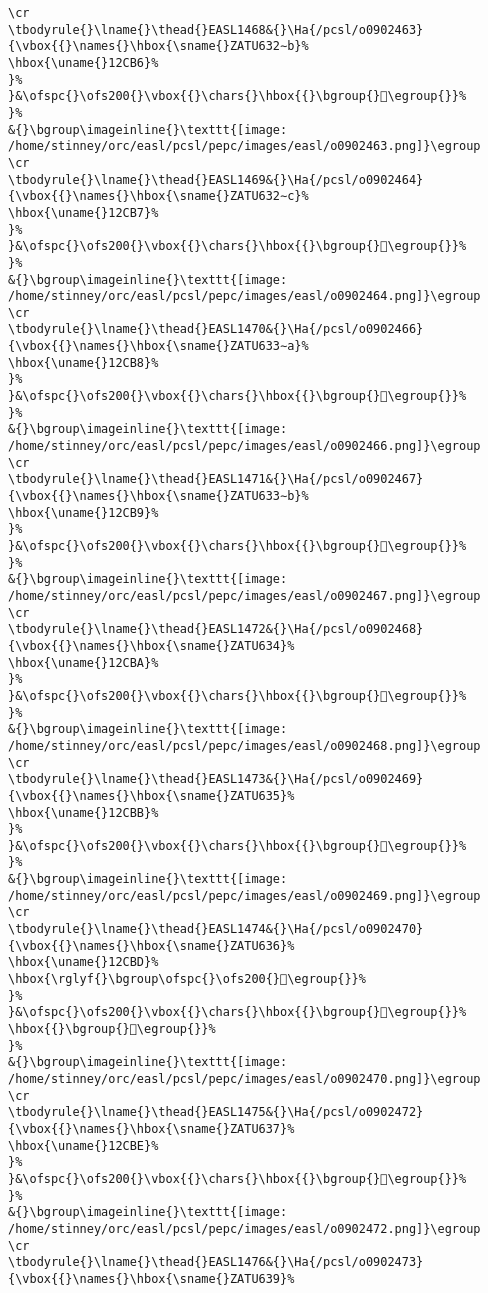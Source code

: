 \begin{verbatim}
\cr
\tbodyrule{}\lname{}\thead{}EASL1468&{}\Ha{/pcsl/o0902463}{\vbox{{}\names{}\hbox{\sname{}ZATU632∼b}%
\hbox{\uname{}12CB6}%
}%
}&\ofspc{}\ofs200{}\vbox{{}\chars{}\hbox{{}\bgroup{}𒲶\egroup{}}%
}%
&{}\bgroup\imageinline{}\texttt{[image: /home/stinney/orc/easl/pcsl/pepc/images/easl/o0902463.png]}\egroup
\cr
\tbodyrule{}\lname{}\thead{}EASL1469&{}\Ha{/pcsl/o0902464}{\vbox{{}\names{}\hbox{\sname{}ZATU632∼c}%
\hbox{\uname{}12CB7}%
}%
}&\ofspc{}\ofs200{}\vbox{{}\chars{}\hbox{{}\bgroup{}𒲷\egroup{}}%
}%
&{}\bgroup\imageinline{}\texttt{[image: /home/stinney/orc/easl/pcsl/pepc/images/easl/o0902464.png]}\egroup
\cr
\tbodyrule{}\lname{}\thead{}EASL1470&{}\Ha{/pcsl/o0902466}{\vbox{{}\names{}\hbox{\sname{}ZATU633∼a}%
\hbox{\uname{}12CB8}%
}%
}&\ofspc{}\ofs200{}\vbox{{}\chars{}\hbox{{}\bgroup{}𒲸\egroup{}}%
}%
&{}\bgroup\imageinline{}\texttt{[image: /home/stinney/orc/easl/pcsl/pepc/images/easl/o0902466.png]}\egroup
\cr
\tbodyrule{}\lname{}\thead{}EASL1471&{}\Ha{/pcsl/o0902467}{\vbox{{}\names{}\hbox{\sname{}ZATU633∼b}%
\hbox{\uname{}12CB9}%
}%
}&\ofspc{}\ofs200{}\vbox{{}\chars{}\hbox{{}\bgroup{}𒲹\egroup{}}%
}%
&{}\bgroup\imageinline{}\texttt{[image: /home/stinney/orc/easl/pcsl/pepc/images/easl/o0902467.png]}\egroup
\cr
\tbodyrule{}\lname{}\thead{}EASL1472&{}\Ha{/pcsl/o0902468}{\vbox{{}\names{}\hbox{\sname{}ZATU634}%
\hbox{\uname{}12CBA}%
}%
}&\ofspc{}\ofs200{}\vbox{{}\chars{}\hbox{{}\bgroup{}𒲺\egroup{}}%
}%
&{}\bgroup\imageinline{}\texttt{[image: /home/stinney/orc/easl/pcsl/pepc/images/easl/o0902468.png]}\egroup
\cr
\tbodyrule{}\lname{}\thead{}EASL1473&{}\Ha{/pcsl/o0902469}{\vbox{{}\names{}\hbox{\sname{}ZATU635}%
\hbox{\uname{}12CBB}%
}%
}&\ofspc{}\ofs200{}\vbox{{}\chars{}\hbox{{}\bgroup{}𒲻\egroup{}}%
}%
&{}\bgroup\imageinline{}\texttt{[image: /home/stinney/orc/easl/pcsl/pepc/images/easl/o0902469.png]}\egroup
\cr
\tbodyrule{}\lname{}\thead{}EASL1474&{}\Ha{/pcsl/o0902470}{\vbox{{}\names{}\hbox{\sname{}ZATU636}%
\hbox{\uname{}12CBD}%
\hbox{\rglyf{}\bgroup\ofspc{}\ofs200{}𒲽\egroup{}}%
}%
}&\ofspc{}\ofs200{}\vbox{{}\chars{}\hbox{{}\bgroup{}𒲼\egroup{}}%
\hbox{{}\bgroup{}𒲽\egroup{}}%
}%
&{}\bgroup\imageinline{}\texttt{[image: /home/stinney/orc/easl/pcsl/pepc/images/easl/o0902470.png]}\egroup
\cr
\tbodyrule{}\lname{}\thead{}EASL1475&{}\Ha{/pcsl/o0902472}{\vbox{{}\names{}\hbox{\sname{}ZATU637}%
\hbox{\uname{}12CBE}%
}%
}&\ofspc{}\ofs200{}\vbox{{}\chars{}\hbox{{}\bgroup{}𒲾\egroup{}}%
}%
&{}\bgroup\imageinline{}\texttt{[image: /home/stinney/orc/easl/pcsl/pepc/images/easl/o0902472.png]}\egroup
\cr
\tbodyrule{}\lname{}\thead{}EASL1476&{}\Ha{/pcsl/o0902473}{\vbox{{}\names{}\hbox{\sname{}ZATU639}%

\end{verbatim}
